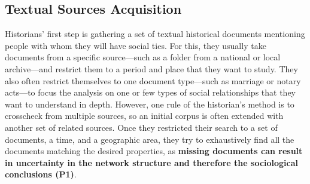 


\subsection{Textual Sources Acquisition}
Historians' first step is gathering a set of textual historical documents mentioning people with whom they will have social ties.
For this, they usually take documents from a specific source---such as a folder from a national or local archive---and restrict them to a period and place that they want to study.
They also often restrict themselves to one document type---such as marriage or notary acts---to focus the analysis on one or few types of social relationships that they want to understand in depth.
However, one rule of the historian's method is to crosscheck from multiple sources, so an initial corpus is often extended with another set of related sources.
Once they restricted their search to a set of documents, a time, and a geographic area, they try to exhaustively find all the documents matching the desired properties, as \textbf{missing documents can result in uncertainty in the network structure and therefore the sociological conclusions (P1)}.

